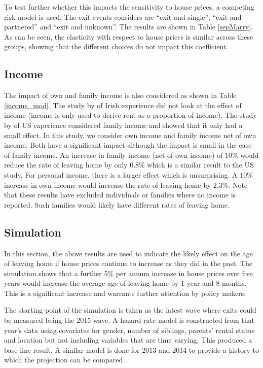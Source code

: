 \documentclass[12pt]{article}
\begin{document}
To test further whether this impacts the sensitivity to house prices, a competing risk model is used. The exit events considers are ``exit and single'', ``exit and partnered'' and ``exit and unknown''. The results are shown in Table \ref{sepMarry}. As can be seen, the elasticity with respect to house prices is similar across these groups, showing that the different choices do not impact this coefficient.



\subsection{Income}

The impact of own and family income is also considered as shown in Table \ref{income_mod}. The study by \cite{byrne2014household} of Irish experience did not look at the effect of income (income is only used to derive rent as a proportion of income). The study by \cite{lee2013happens}  of US experience considered family income and showed that it only had a small effect. In this study, we consider own income and family income net of own income.  Both have a significant impact although the impact is small in the case of family income. An increase in family income (net of own income) of $10\%$ would reduce the rate of leaving home by only $0.8\%$ which is a similar result to the US study. For personal income, there is a larger effect which is unsurprising. A $10\%$ increase in own income would increase the rate of leaving home by $2.3\%$. Note that these results have excluded individuals or families where no income is reported. Such families would likely have different rates of leaving home.



\subsection{Simulation}

In this section, the above results are used to indicate the likely effect on the age of leaving home if house prices continue to increase as they did in the past. The simulation shows that a further 5\% per annum increase in house prices over five years would increase the average age of leaving home by 1 year and 8 months. This is a significant increase and warrants further attention by policy makers.

The starting point of the simulation is taken as the latest wave where exits could be measured being the 2015 wave. A hazard rate model is constructed from that year's data using covariates for gender, number of siblings, parents' rental status and location but not including variables that are time varying. This produced a base line result. A similar model is done for 2013 and 2014 to provide a history to which the projection can be compared.
\end{document}

